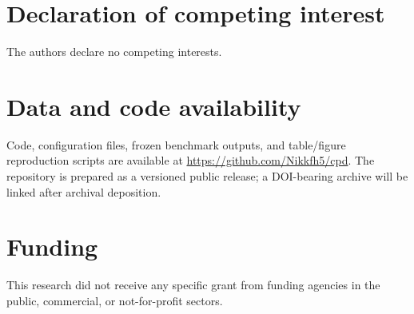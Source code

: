 \documentclass{ws-fnl}
\begin{document}









\section*{Declaration of competing interest}
The authors declare no competing interests.

\section*{Data and code availability}
Code, configuration files, frozen benchmark outputs, and table/figure
reproduction scripts are available at \url{https://github.com/Nikkfh5/cpd}.
The repository is prepared as a versioned public release; a DOI-bearing archive
will be linked after archival deposition.

\section*{Funding}
This research did not receive any specific grant from funding agencies in the
public, commercial, or not-for-profit sectors.



\end{document}
